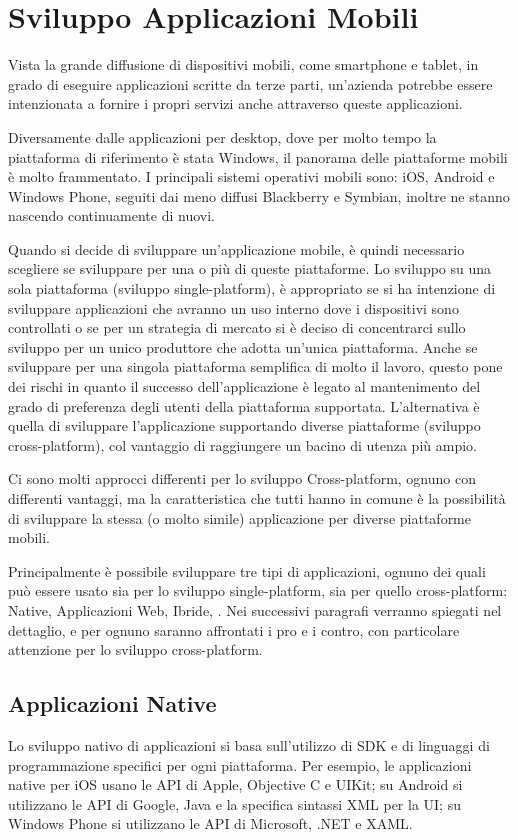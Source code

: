 \chapter{Sviluppo Applicazioni Mobili}
	Vista la grande diffusione di dispositivi mobili, come smartphone e tablet, in grado di eseguire applicazioni scritte da terze parti, un'azienda potrebbe essere intenzionata a fornire i propri servizi anche attraverso queste applicazioni.
	
	Diversamente dalle applicazioni per desktop, dove per molto tempo la piattaforma di riferimento è stata Windows, il panorama delle piattaforme mobili è molto frammentato.
	I principali sistemi operativi mobili sono: iOS, Android e Windows Phone, seguiti dai meno diffusi Blackberry e Symbian, inoltre ne stanno nascendo continuamente di nuovi.
	
	Quando si decide di sviluppare un'applicazione mobile, è quindi necessario scegliere se sviluppare per una o più di queste piattaforme.
	Lo sviluppo su una sola piattaforma (sviluppo single-platform), è appropriato se si ha intenzione di sviluppare applicazioni che avranno un uso interno dove i dispositivi sono controllati o se per un strategia di mercato si è deciso di concentrarci sullo sviluppo per un unico produttore che adotta un'unica piattaforma.
	Anche se sviluppare per una singola piattaforma semplifica di molto il lavoro, questo pone dei rischi in quanto il successo dell'applicazione è legato al mantenimento del grado di preferenza degli utenti della piattaforma supportata.
	L'alternativa è quella di sviluppare l'applicazione supportando diverse piattaforme (sviluppo cross-platform), col vantaggio di raggiungere un bacino di utenza più ampio.
	
	Ci sono molti approcci differenti per lo sviluppo Cross-platform, ognuno con differenti vantaggi, ma la caratteristica che tutti hanno in comune è la possibilità di sviluppare la stessa (o molto simile) applicazione per diverse piattaforme mobili.
	 
	Principalmente è possibile sviluppare tre tipi di applicazioni, ognuno dei quali può essere usato sia per lo sviluppo single-platform, sia per quello cross-platform: Native, Applicazioni Web, Ibride, .
	Nei successivi paragrafi verranno spiegati nel dettaglio, e per ognuno saranno affrontati i pro e i contro, con particolare attenzione per lo sviluppo cross-platform.
	
	\section{Applicazioni Native}
		Lo sviluppo nativo di applicazioni si basa sull'utilizzo di SDK e di linguaggi di programmazione specifici per ogni piattaforma. Per esempio, le applicazioni native per iOS usano le API di Apple, Objective C e UIKit; su Android si utilizzano le API di Google, Java e la specifica sintassi XML per la UI; su Windows Phone si utilizzano le API di Microsoft, .NET e XAML.

